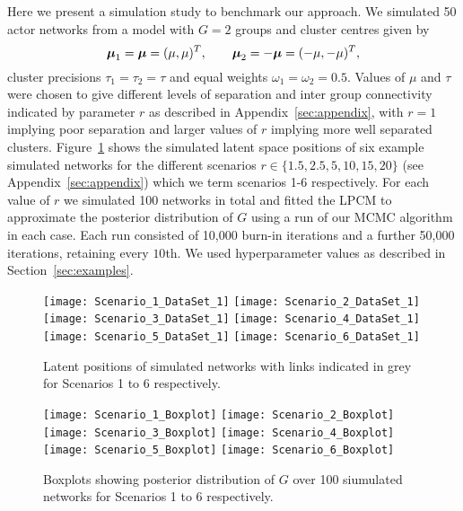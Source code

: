 \documentclass[12pt]{article}
\newcommand{\bfmu}{\hbox{\boldmath$\mu$}}
\begin{document}
Here we present a simulation study to benchmark our approach. We simulated 50 actor networks from a model with $G=2$ groups and cluster centres given by 
\[
\bfmu_1 = \bfmu = (\mu,\mu)^T, \qquad \bfmu_2 = -\bfmu =  (-\mu,-\mu)^T,
\]
cluster precisions $\tau_1 = \tau_2 = \tau$ and equal weights $\omega_1 = \omega_2 = 0.5$. Values of $\mu$ and $\tau$ were chosen to give different levels of separation and inter group connectivity indicated by parameter $r$ as described in Appendix~\ref{sec:appendix}, with $r = 1$ implying poor separation and larger values of $r$ implying more well separated clusters. Figure~\ref{fig:simlpos} shows the simulated latent space positions of six example simulated networks for the different scenarios $r \in \{1.5, 2.5,5,10,15,20\}$ (see Appendix~\ref{sec:appendix}) which we term scenarios 1-6 respectively. For each value of $r$ we simulated 100 networks in total and fitted the LPCM to approximate the posterior distribution of $G$ using a run of our MCMC algorithm in each case. Each run consisted of 10,000 burn-in iterations and a further 50,000 iterations, retaining every $10$th. We used hyperparameter values as described in Section~\ref{sec:examples}.



\begin{figure}
\begin{center}
\texttt{[image: Scenario\_1\_DataSet\_1]}
\texttt{[image: Scenario\_2\_DataSet\_1]}
\texttt{[image: Scenario\_3\_DataSet\_1]}
\texttt{[image: Scenario\_4\_DataSet\_1]}
\texttt{[image: Scenario\_5\_DataSet\_1]}
\texttt{[image: Scenario\_6\_DataSet\_1]}
\end{center}
\caption{Latent positions of simulated networks with links indicated in grey for Scenarios 1 to 6 respectively.} \label{fig:simlpos}
\end{figure}


\begin{figure}[!h]
\begin{center}
\texttt{[image: Scenario\_1\_Boxplot]}
\texttt{[image: Scenario\_2\_Boxplot]}
\texttt{[image: Scenario\_3\_Boxplot]}
\texttt{[image: Scenario\_4\_Boxplot]}
\texttt{[image: Scenario\_5\_Boxplot]}
\texttt{[image: Scenario\_6\_Boxplot]}
\end{center}
\caption{Boxplots showing posterior distribution of $G$ over 100 siumulated networks for Scenarios 1 to 6 respectively.} \label{fig:simboxplot}
\end{figure}
\end{document}
